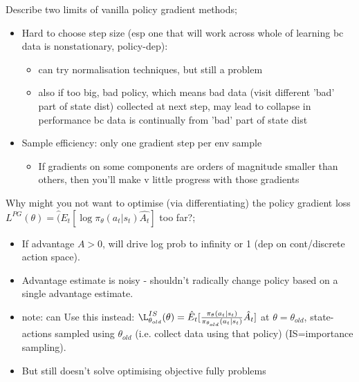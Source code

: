\documentclass{article}
\begin{document}


Describe two limits of vanilla policy gradient methods; \begin{itemize}
    \item Hard to choose step size (esp one that will work across whole of learning bc data is nonstationary, policy-dep): 
    \begin{itemize}
        \item can try normalisation techniques, but still a problem
        \item also if too big, bad policy, which means bad data (visit different 'bad' part of state dist) collected at next step, may lead to collapse in performance bc data is continually from 'bad' part of state dist
    \end{itemize}
    \item Sample efficiency: only one gradient step per env sample
    \begin{itemize}
        \item If gradients on some components are orders of magnitude smaller than others, then you'll make v little progress with those gradients
    \end{itemize}
\end{itemize}


Why might you not want to optimise (via differentiating) the policy gradient loss $L^{PG}(\theta) = \hat(E_t[\log\pi_\theta(a_t|s_t)\hat{A_t}]$ too far?; \begin{itemize}
    \item If advantage $A>0$, will drive log prob to infinity or 1 (dep on cont/discrete action space).
    \item Advantage estimate is noisy - shouldn't radically change policy based on a single advantage estimate.
    \item note: can Use this instead: $\L^{IS}_{\theta_{old}}(\theta) = \hat{E}_t[\frac{\pi_\theta(a_t|s_t)}{\pi_{\theta_{old}}(a_t|s_t)}\hat{A_t}]$ at $\theta=\theta_{old}$, state-actions sampled using $\theta_{old}$ (i.e. collect data using that policy) (IS=importance sampling).
    \item But still doesn't solve optimising objective fully problems
\end{itemize}
\end{document}
